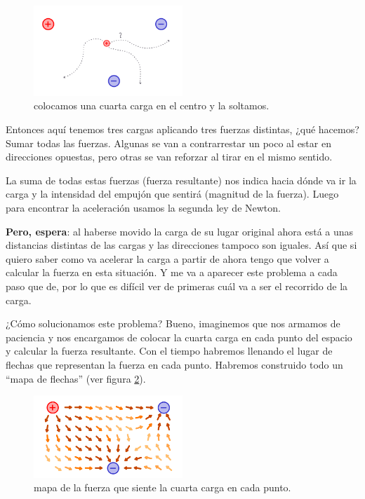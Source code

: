 \begin{figure}[ht]
    \centering
    \includegraphics[width=0.5\textwidth]{images/field_ex_2.png}
    \caption{colocamos una cuarta carga en el centro y la soltamos.}
    \label{fig:campo_electrico_ejemplo_2}
\end{figure}

Entonces aquí tenemos tres cargas aplicando tres fuerzas distintas, ¿qué hacemos? Sumar todas las fuerzas. Algunas se van a contrarrestar un poco al estar en direcciones opuestas, pero otras se van reforzar al tirar en el mismo sentido.

La suma de todas estas fuerzas (fuerza resultante) nos indica hacia dónde va ir la carga y la intensidad del empujón que sentirá (magnitud de la fuerza). Luego para encontrar la aceleración usamos la segunda ley de Newton. 

\textbf{Pero, espera}: al haberse movido la carga de su lugar original ahora está a unas distancias distintas de las cargas y las direcciones tampoco son iguales. Así que si quiero saber como va acelerar la carga a partir de ahora tengo que volver a calcular la fuerza en esta situación. Y me va a aparecer este problema a cada paso que de, por lo que es difícil ver de primeras cuál va a ser el recorrido de la carga.

¿Cómo solucionamos este problema? Bueno, imaginemos que nos armamos de paciencia y nos encargamos de colocar la cuarta carga en cada punto del espacio y calcular la fuerza resultante. Con el tiempo habremos llenando el lugar de flechas que representan la fuerza en cada punto. Habremos construido todo un ``mapa de flechas'' (ver figura \ref{fig:campo_electrico_ejemplo_3}).

\begin{figure}[ht]
    \centering
    \includegraphics[width=0.5\textwidth]{images/field_example.png}
    \caption{mapa de la fuerza que siente la cuarta carga en cada punto.}
    \label{fig:campo_electrico_ejemplo_3}
\end{figure}

